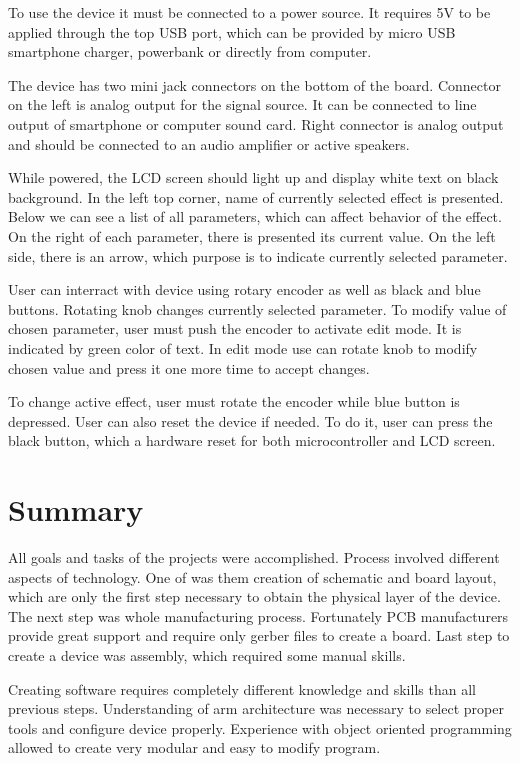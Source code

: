 \documentclass[a4paper,twoside,12pt]{book}
\begin{document}
To use the device it must be connected to a power source.
It requires 5V to be applied through the top USB port,
which can be provided by micro USB smartphone charger,
powerbank or directly from computer.

The device has two mini jack connectors on the bottom of the board.
Connector on the left is analog output for the signal source.
It can be connected to line output of smartphone or computer sound card.
Right connector is analog output and should be connected
to an audio amplifier or active speakers.

While powered, the LCD screen should light up
and display white text on black background.
In the left top corner, name of currently selected effect is presented.
Below we can see a list of all parameters,
which can affect behavior of the effect.
On the right of each parameter, there is presented its current value.
On the left side, there is an arrow,
which purpose is to indicate currently selected parameter.

User can interract with device using rotary encoder
as well as black and blue buttons.
Rotating knob changes currently selected parameter.
To modify value of chosen parameter, user must push the encoder
to activate edit mode. It is indicated by green color of text.
In edit mode use can rotate knob to modify chosen value
and press it one more time to accept changes.

To change active effect, user must rotate the encoder
while blue button is depressed. User can also reset the device if needed.
To do it, user can press the black button,
which a hardware reset for both microcontroller and LCD screen.

\chapter{Summary}
All goals and tasks of the projects were accomplished.
Process involved different aspects of technology.
One of was them creation of schematic and board layout,
which are only the first step necessary to obtain 
the physical layer of the device.
The next step was whole manufacturing process.
Fortunately PCB manufacturers provide great support
and require only gerber files to create a board.
Last step to create a device was assembly,
which required some manual skills.

Creating software requires completely different
knowledge and skills than all previous steps.
Understanding of arm architecture was necessary
to select proper tools and configure device properly.
Experience with object oriented programming
allowed to create very modular and easy to modify program.
\end{document}
